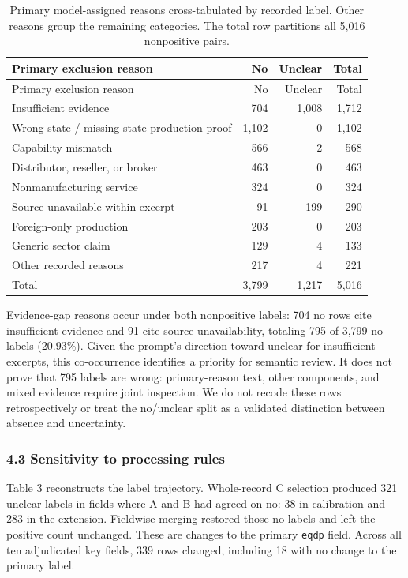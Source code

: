 \documentclass[10pt]{article}
\begin{document}
\begin{longtable}[]{@{}lrrr@{}}
\caption{Primary model-assigned reasons cross-tabulated by recorded label. Other reasons group the remaining categories. The total row partitions all 5,016 nonpositive pairs.}\tabularnewline
\toprule\noalign{}
Primary exclusion reason & No & Unclear & Total \\
\midrule\noalign{}
\endfirsthead
\toprule\noalign{}
Primary exclusion reason & No & Unclear & Total \\
\midrule\noalign{}
\endhead
\bottomrule\noalign{}
\endlastfoot
Insufficient evidence & 704 & 1,008 & 1,712 \\
Wrong state / missing state-production proof & 1,102 & 0 & 1,102 \\
Capability mismatch & 566 & 2 & 568 \\
Distributor, reseller, or broker & 463 & 0 & 463 \\
Nonmanufacturing service & 324 & 0 & 324 \\
Source unavailable within excerpt & 91 & 199 & 290 \\
Foreign-only production & 203 & 0 & 203 \\
Generic sector claim & 129 & 4 & 133 \\
Other recorded reasons & 217 & 4 & 221 \\
Total & 3,799 & 1,217 & 5,016 \\
\end{longtable}

Evidence-gap reasons occur under both nonpositive labels: 704 no rows cite insufficient evidence and 91 cite source unavailability, totaling 795 of 3,799 no labels (20.93\%). Given the prompt's direction toward unclear for insufficient excerpts, this co-occurrence identifies a priority for semantic review. It does not prove that 795 labels are wrong: primary-reason text, other components, and mixed evidence require joint inspection. We do not recode these rows retrospectively or treat the no/unclear split as a validated distinction between absence and uncertainty.

\hypertarget{sensitivity-to-processing-rules}{%
\subsubsection{4.3 Sensitivity to processing rules}\label{sensitivity-to-processing-rules}}

Table 3 reconstructs the label trajectory. Whole-record C selection produced 321 unclear labels in fields where A and B had agreed on no: 38 in calibration and 283 in the extension. Fieldwise merging restored those no labels and left the positive count unchanged. These are changes to the primary \texttt{eqdp} field. Across all ten adjudicated key fields, 339 rows changed, including 18 with no change to the primary label.
\end{document}
